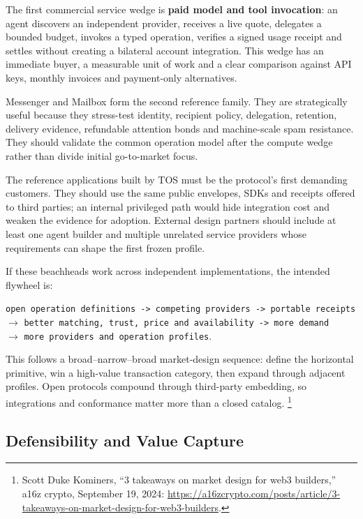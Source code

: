 \documentclass[11pt,oneside]{article}
\begin{document}
The first commercial service wedge is \textbf{paid model and tool invocation}: an agent
discovers an independent provider, receives a live quote, delegates a bounded budget, invokes
a typed operation, verifies a signed usage receipt and settles without creating a bilateral
account integration. This wedge has an immediate buyer, a measurable unit of work and a clear
comparison against API keys, monthly invoices and payment-only alternatives.

Messenger and Mailbox form the second reference family. They are strategically useful because
they stress-test identity, recipient policy, delegation, retention, delivery evidence,
refundable attention bonds and machine-scale spam resistance. They should validate the common
operation model after the compute wedge rather than divide initial go-to-market focus.

The reference applications built by TOS must be the protocol's first demanding customers.
They should use the same public envelopes, SDKs and receipts offered to third parties; an
internal privileged path would hide integration cost and weaken the evidence for adoption.
External design partners should include at least one agent builder and multiple unrelated
service providers whose requirements can shape the first frozen profile.

If these beachheads work across independent implementations, the intended flywheel is:

\begin{center}
\texttt{open operation definitions -> competing providers -> portable receipts}\\
$\longrightarrow$ \texttt{better matching, trust, price and availability -> more demand}\\
$\longrightarrow$ \texttt{more providers and operation profiles}.
\end{center}

This follows a broad--narrow--broad market-design sequence: define the horizontal primitive,
win a high-value transaction category, then expand through adjacent profiles. Open protocols
compound through third-party embedding, so integrations and conformance matter more than a
closed catalog.
\footnote{Scott Duke Kominers, ``3 takeaways on market design for web3 builders,'' a16z
crypto, September 19, 2024:
\url{https://a16zcrypto.com/posts/article/3-takeaways-on-market-design-for-web3-builders}.}

\subsection{Defensibility and Value Capture}
\end{document}
